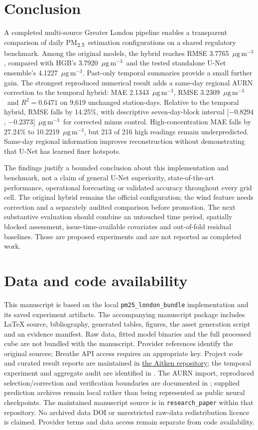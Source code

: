 \documentclass[11pt,a4paper]{article}
\newcommand{\pmfine}{PM\textsubscript{2.5}}
\newcommand{\ug}{\ensuremath{\mu\mathrm{g}\,\mathrm{m}^{-3}}}
\begin{document}
\section{Conclusion}
A completed multi-source Greater London pipeline enables a transparent
comparison of daily \pmfine\ estimation configurations on a shared regulatory
benchmark. Among the original models, the hybrid reaches RMSE 3.7765~\ug,
compared with HGB's 3.7920~\ug\ and the tested standalone U-Net ensemble's
4.1227~\ug. Past-only temporal summaries provide a small further gain.
The strongest reproduced numerical result adds a same-day regional AURN
correction to the temporal hybrid: MAE 2.1343~\ug, RMSE 3.2309~\ug\ and
$R^2=0.6471$ on 9,619 unchanged station-days. Relative to the temporal hybrid,
RMSE falls by 14.25\%, with descriptive seven-day-block interval
[$-0.8294$, $-0.2373$]~\ug\ for corrected minus control.
High-concentration MAE falls by 27.24\% to 10.2219~\ug, but 213 of 216
high readings remain underpredicted. Same-day regional information improves
reconstruction without demonstrating that U-Net has learned finer hotspots.

The findings justify a bounded conclusion about this implementation and
benchmark, not a claim of general U-Net superiority, state-of-the-art
performance, operational forecasting or validated accuracy throughout every
grid cell. The original hybrid remains the official configuration; the wind
feature needs correction and a separately audited comparison before promotion.
The next substantive evaluation should combine an untouched time
period, spatially blocked assessment, issue-time-available covariates and
out-of-fold residual baselines. Those are proposed experiments and are not
reported as completed work.

\section*{Data and code availability}
This manuscript is based on the local \texttt{pm25\_london\_bundle} implementation
and its saved experiment artifacts. The accompanying manuscript package
includes LaTeX source, bibliography, generated tables, figures, the asset
generation script and an evidence manifest. Raw data, fitted model binaries
and the full processed cube are not bundled with the manuscript. Provider
references identify the original sources; Breathe API access requires an
appropriate key. Project code and curated result reports are maintained in
\href{https://github.com/r9jdp/Aitken}{the Aitken repository}; the temporal
experiment and aggregate audit are identified in \citet{aitkentemporal2026}.
The AURN import, reproduced selection/correction and verification boundaries
are documented in \citet{aitkenaurn2026}; supplied prediction archives remain
local rather than being represented as public neural checkpoints.
The maintained manuscript source is in \texttt{research\_paper} within that
repository. No archived data DOI or unrestricted raw-data redistribution
licence is claimed. Provider terms and data access remain separate from code
availability.
\end{document}
